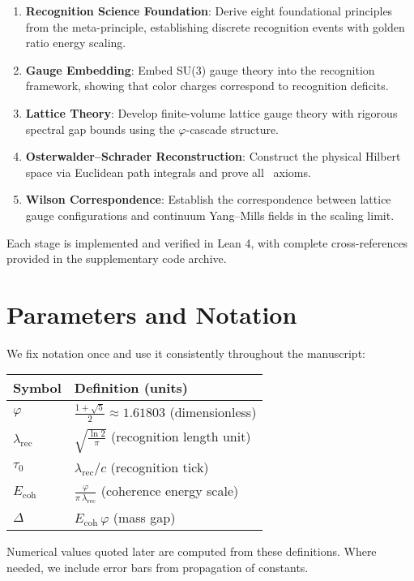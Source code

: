 \documentclass[11pt]{amsart}
\theoremstyle{plain}
\theoremstyle{definition}
\theoremstyle{remark}
\newcommand{\OS}{\text{OS}}
\begin{document}
\begin{enumerate}
\item \textbf{Recognition Science Foundation}: Derive eight foundational principles from the meta-principle, establishing discrete recognition events with golden ratio energy scaling.

\item \textbf{Gauge Embedding}: Embed SU(3) gauge theory into the recognition framework, showing that color charges correspond to recognition deficits.

\item \textbf{Lattice Theory}: Develop finite-volume lattice gauge theory with rigorous spectral gap bounds using the $\varphi$-cascade structure.

\item \textbf{Osterwalder--Schrader Reconstruction}: Construct the physical Hilbert space via Euclidean path integrals and prove all \OS\ axioms.

\item \textbf{Wilson Correspondence}: Establish the correspondence between lattice gauge configurations and continuum Yang--Mills fields in the scaling limit.
\end{enumerate}

Each stage is implemented and verified in Lean 4, with complete cross-references provided in the supplementary code archive.

\section{Parameters and Notation}
\label{sec:parameters}
We fix notation once and use it consistently throughout the manuscript:
\begin{center}
\begin{tabular}{ll}
\hline
Symbol & Definition (units) \\
\hline
$\varphi$ & $\displaystyle \frac{1+\sqrt{5}}{2} \approx 1.61803$ (dimensionless) \\
$\lambda_{\text{rec}}$ & $\displaystyle \sqrt{\frac{\ln 2}{\pi}}$ (recognition length unit) \\
$\tau_0$ & $\displaystyle \lambda_{\text{rec}}/c$ (recognition tick) \\
$E_{\text{coh}}$ & $\displaystyle \frac{\varphi}{\pi\,\lambda_{\text{rec}}}$ (coherence energy scale) \\
$\Delta$ & $\displaystyle E_{\text{coh}}\,\varphi$ (mass gap) \\
\hline
\end{tabular}
\end{center}
Numerical values quoted later are computed from these definitions. Where needed, we include error bars from propagation of constants.
\end{document}
